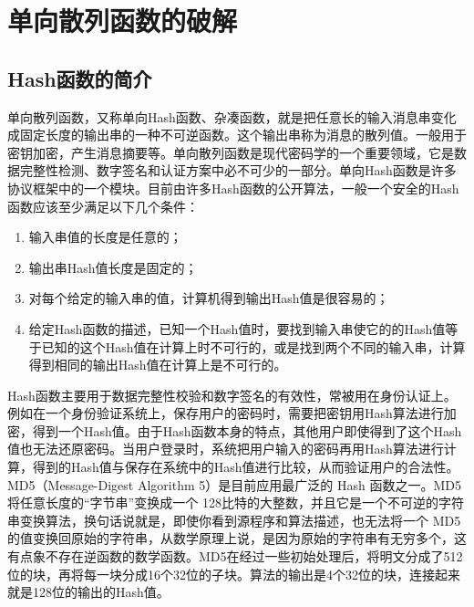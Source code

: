 \section{单向散列函数的破解}
\subsection{Hash函数的简介}
单向散列函数，又称单向Hash函数、杂凑函数，就是把任意长的输入消息串变化成固定长度的输出串的一种不可逆函数。这个输出串称为消息的散列值。一般用于密钥加密，产生消息摘要等。单向散列函数是现代密码学的一个重要领域，它是数据完整性检测、数字签名和认证方案中必不可少的一部分。单向Hash函数\cite{hash}是许多协议框架中的一个模块。目前由许多Hash函数的公开算法，一般一个安全的Hash函数应该至少满足以下几个条件：
\begin{enumerate}
\item 输入串值的长度是任意的；
\item 输出串Hash值长度是固定的；
\item 对每个给定的输入串的值，计算机得到输出Hash值是很容易的；
\item 给定Hash函数的描述，已知一个Hash值时，要找到输入串使它的的Hash值等于已知的这个Hash值在计算上时不可行的，或是找到两个不同的输入串，计算得到相同的输出Hash值在计算上是不可行的。
\end{enumerate}
Hash函数主要用于数据完整性校验和数字签名的有效性，常被用在身份认证上。例如在一个身份验证系统上，保存用户的密码时，需要把密钥用Hash算法进行加密，得到一个Hash值。由于Hash函数本身的特点，其他用户即使得到了这个Hash值也无法还原密码。当用户登录时，系统把用户输入的密码再用Hash算法进行计算，得到的Hash值与保存在系统中的Hash值进行比较，从而验证用户的合法性。
MD5\cite{md5}（Message-Digest Algorithm 5）是目前应用最广泛的 Hash 函数之一。MD5 将任意长度的“字节串”变换成一个 128比特的大整数，并且它是一个不可逆的字符串变换算法，换句话说就是，即使你看到源程序和算法描述，也无法将一个 MD5 的值变换回原始的字符串，从数学原理上说，是因为原始的字符串有无穷多个，这有点象不存在逆函数的数学函数。MD5在经过一些初始处理后，将明文分成了512位的块，再将每一块分成16个32位的子块。算法的输出是4个32位的块，连接起来就是128位的输出的Hash值。
